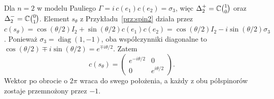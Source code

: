 \begin{przyklad}
Dla $n=2$ w modelu Pauliego
$\Gamma=i\,c(e_1)c(e_2)=\sigma_3$,
więc $\Delta^+_2=\mathbb{C}\binom10$ oraz
$\Delta^-_2=\mathbb{C}\binom01$.
Element $s_\theta$ z Przykładu~\ref{prz:spin2}
działa przez
$c(s_\theta)=\cos(\theta/2)I_2
+\sin(\theta/2)c(e_1)c(e_2)
=\cos(\theta/2)I_2-i\sin(\theta/2)\sigma_3$.
Ponieważ $\sigma_3=\operatorname{diag}(1,-1)$,
oba współczynniki diagonalne to
$\cos(\theta/2)\mp i\sin(\theta/2)=e^{\mp i\theta/2}$.
Zatem
\[
 c(s_\theta)=
 \begin{pmatrix}
  e^{-i\theta/2}&0\\0&e^{i\theta/2}
 \end{pmatrix}.
\]
Wektor po obrocie o $2\pi$ wraca do swego
położenia, a każdy z obu półspinorów
zostaje przemnożony przez $-1$.
\end{przyklad}


